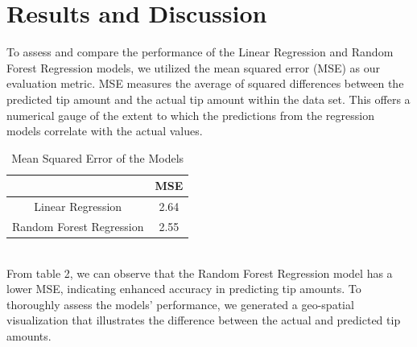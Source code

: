 \documentclass[11pt]{article}
\begin{document}
\section{Results and Discussion}
To assess and compare the performance of the Linear Regression and Random Forest Regression models, we utilized the mean squared error (MSE) as our evaluation metric. MSE measures the average of squared differences between the predicted tip amount and the actual tip amount within the data set. This offers a numerical gauge of the extent to which the predictions from the regression models correlate with the actual values.\\
\begin{table}[h]
\centering
\begin{tabular}{|c|c|}\hline
& MSE\\ \hline\hline
Linear Regression & 2.64\\ \hline
Random Forest Regression & 2.55\\ \hline
\end{tabular}
\caption{Mean Squared Error of the Models}
\end{table}\\
From table 2, we can observe that the Random Forest Regression model has a lower MSE, indicating enhanced accuracy in predicting tip amounts. To thoroughly assess the models' performance, we generated a geo-spatial visualization that illustrates the difference between the actual and predicted tip amounts.
\end{document}
